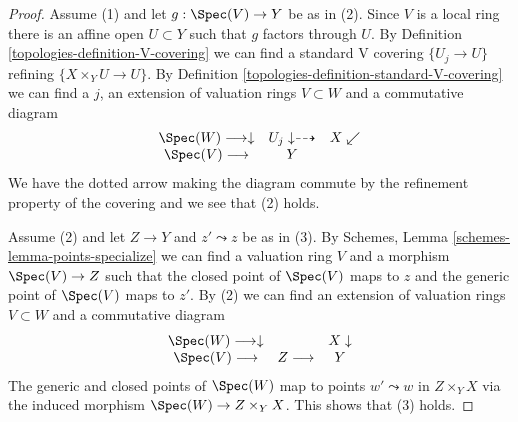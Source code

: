 \begin{proof}

Assume (1) and let $g : \Spec(V) \to Y$ be as in (2).
Since $V$ is a local ring there is an affine open $U \subset Y$
such that $g$ factors through $U$. By Definition \ref{topologies-definition-V-covering}
we can find a standard V covering $\{U_j \to U\}$ refining
$\{X \times_Y U \to U\}$. By Definition \ref{topologies-definition-standard-V-covering}
we can find a $j$, an extension of valuation rings $V \subset W$
and a commutative diagram
$$
\begin{array}{ccc}\Spec(W) \longrightarrow\downarrow & U_j \downarrow\dashrightarrow & X \swarrow \\ \Spec(V) \longrightarrow & Y & \end{array}
$$
We have the dotted arrow making the diagram commute by the refinement
property of the covering and we see that (2) holds.

\medskip\noindent
Assume (2) and let $Z \to Y$ and $z' \leadsto z$ be as in (3).
By Schemes, Lemma \ref{schemes-lemma-points-specialize}
we can find a valuation ring $V$ and a morphism $\Spec(V) \to Z$
such that the closed point of $\Spec(V)$ maps to $z$ and the
generic point of $\Spec(V)$ maps to $z'$. By (2) we can find an
extension of valuation rings $V \subset W$ and a
commutative diagram
$$
\begin{array}{ccc}\Spec(W) \longrightarrow\downarrow &  & X \downarrow \\ \Spec(V) \longrightarrow & Z \longrightarrow & Y\end{array}
$$
The generic and closed points of $\Spec(W)$ map to points
$w' \leadsto w$ in $Z \times_Y X$ via the
induced morphism $\Spec(W) \to Z \times_Y X$.
This shows that (3) holds.


\end{proof}
